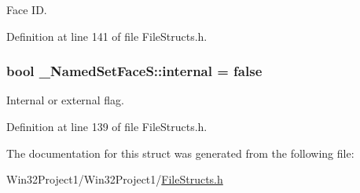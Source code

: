 Face ID. 



Definition at line 141 of file File\+Structs.\+h.

\subsubsection[{\texorpdfstring{internal}{internal}}]{\setlength{\rightskip}{0pt plus 5cm}bool \+\_\+\+Named\+Set\+Face\+S\+::internal = false}\hypertarget{struct___named_set_face_s_ad89d075c31bb09b5d09a4f0ef1bcf3b1}{}\label{struct___named_set_face_s_ad89d075c31bb09b5d09a4f0ef1bcf3b1}


Internal or external flag. 



Definition at line 139 of file File\+Structs.\+h.



The documentation for this struct was generated from the following file\+:\begin{DoxyCompactItemize}
\item 
Win32\+Project1/\+Win32\+Project1/\hyperlink{_file_structs_8h}{File\+Structs.\+h}\end{DoxyCompactItemize}
